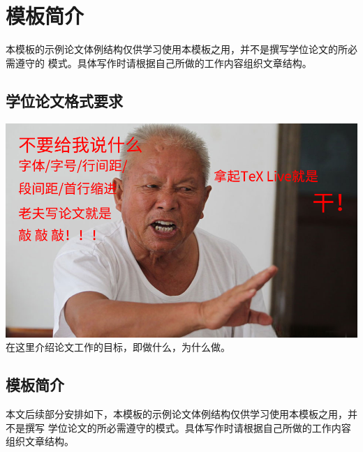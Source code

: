 
\chapter{\texorpdfstring{\XeLaTeX{}}{XeLaTeX}模板简介}
\label{cha:intro}

本模板的示例论文体例结构仅供学习使用本模板之用，并不是撰写学位论文的所必需遵守的
模式。具体写作时请根据自己所做的工作内容组织文章结构。

\section{学位论文格式要求}
\label{sec:motivation}
\includegraphics[scale=0.3]{tex.png}
在这里介绍论文工作的目标，即做什么，为什么做。

\section{\texorpdfstring{\XeLaTeX{}}{XeLaTeX}模板简介}
\label{sec:related-works}

本文后续部分安排如下，本模板的示例论文体例结构仅供学习使用本模板之用，并不是撰写
学位论文的所必需遵守的模式。具体写作时请根据自己所做的工作内容组织文章结构。

